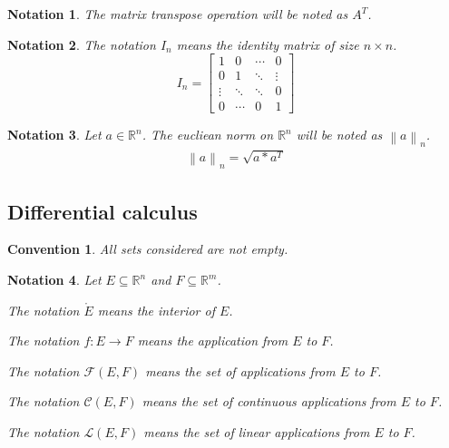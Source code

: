\documentclass[11pt,en]{elegantpaper}
\newtheorem{convention}{Convention}
\newtheorem{notation}{Notation}
\newcommand{\norm}[1]{\left\lVert#1\right\rVert}
\newcommand{\Real}{\mathbb{R}}
\begin{document}
\begin{notation}
  The matrix transpose operation will be noted as $A^T$.
\end{notation}

\begin{notation}
  The notation $I_n$ means the identity matrix of size $n \times n$. \begin{equation*}
    I_n = \begin{bmatrix}
      1 & 0 & \cdots & 0 \\
      0 & 1 & \ddots & \vdots \\
      \vdots & \ddots & \ddots & 0 \\
      0 & \cdots & 0 & 1
    \end{bmatrix}
  \end{equation*}
\end{notation}

\begin{notation}
  Let $a \in \Real^n$. The eucliean norm on $\Real^n$ will be noted as $\norm a _n$.
  \begin{gather*}
    \norm a _n = \sqrt{a * a^T}
  \end{gather*}
\end{notation}

\subsection{Differential calculus}

\begin{convention}
  All sets considered are not empty.
\end{convention}

\begin{notation}
  Let $E \subseteq \Real^n$ and $F \subseteq \Real^m$. \par
  The notation $\mathring{E}$ means the interior of $E$. \par
  The notation $f : E \longrightarrow F$ means the application from $E$ to $F$. \par
  The notation $\mathcal{F}(E,F)$ means the set of applications from $E$ to $F$. \par
  The notation $\mathcal{C}(E,F)$ means the set of continuous applications from $E$ to $F$. \par
  The notation $\mathcal{L}(E,F)$ means the set of linear applications from $E$ to $F$.
\end{notation}
\end{document}
